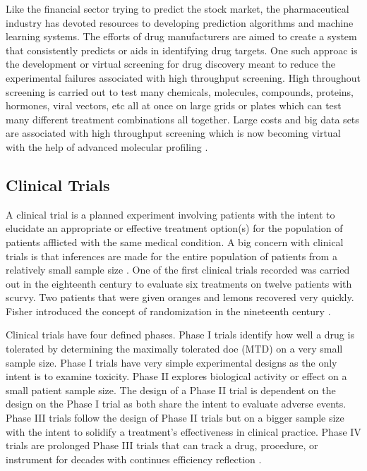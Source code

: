 \documentclass[sigconf]{acmart}
\begin{document}
Like the financial sector trying to predict the stock market, the pharmaceutical industry has devoted resources to developing prediction algorithms and machine learning systems. The efforts of drug manufacturers are aimed to create a system that consistently predicts or aids in identifying drug targets. One such approac is the development or virtual screening for drug discovery meant to reduce the experimental failures associated with high throughput screening. High throughout screening is carried out to test many chemicals, molecules, compounds, proteins, hormones, viral vectors, etc all at once on large grids or plates which can test many different treatment combinations all together. Large costs and big data sets are associated with high throughput screening which is now becoming virtual with the help of advanced molecular profiling \cite{kitchen}.



\subsection{Clinical Trials}
A clinical trial is a planned experiment involving patients with the intent to elucidate an appropriate or effective treatment option(s) for the population of patients afflicted with the same medical condition. A big concern with clinical trials is that inferences are made for the entire population of patients from a relatively small sample size \cite{Pocock}. One of the first clinical trials recorded was carried out in the eighteenth century to evaluate six treatments on  twelve patients with scurvy. Two patients that were given oranges and lemons recovered very quickly. Fisher introduced the concept of randomization in the nineteenth century \cite{Friedman}.

Clinical trials have four defined phases. Phase I trials identify how well a drug is tolerated by determining the maximally tolerated doe (MTD) on a very small sample size. Phase I trials have very simple experimental designs as the only intent is to examine toxicity. Phase II explores biological activity or effect on a small patient sample size. The design of a Phase II trial is dependent on the design on the Phase I trial as both share the intent to evaluate adverse events. Phase III trials follow the design of Phase II trials but on a bigger sample size with the intent to solidify a treatment's effectiveness in clinical practice. Phase IV trials are prolonged Phase III trials that can track a drug, procedure, or instrument for decades with continues efficiency reflection \cite{Friedman}. 
\end{document}
